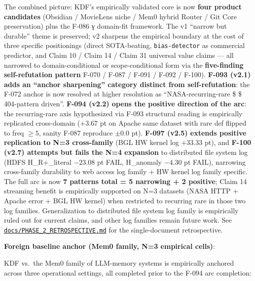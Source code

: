 The combined picture: KDF's empirically validated core is now \textbf{four
product candidates} (Obsidian / MovieLens niche / Mem0 hybrid Router /
Git Core preservation) plus the F-086 γ domain-fit framework. The v1
``narrow but durable'' theme is preserved; v2 sharpens the empirical
boundary at the cost of three specific positionings (direct
SOTA-beating, \texttt{bias-detector} as commercial predictor, and Claim 10 /
Claim 14 / Claim 31 universal value claims --- all narrowed to
domain-conditional or scope-conditional form via the \textbf{five-finding
self-refutation pattern} F-070 / F-087 / F-091 / F-092 / F-100). \textbf{F-093
(v2.1) adds an ``anchor sharpening'' category distinct from
self-refutation}: the F-072 anchor is now resolved at higher
resolution as ``NASA-recurring-rare \$\times {} \times \$
404-pattern driven''. \textbf{F-094 (v2.2) opens the positive direction of
the arc}: the recurring-rare axis hypothesized via F-093 structural
reading is empirically replicated cross-domain (\(+3.67\) pt on Apache
same dataset with rare def flipped to freq \(\ge 5\), sanity F-087
reproduce \(\pm 0.0\) pt). \textbf{F-097 (v2.5) extends positive replication to
N=3 cross-family} (BGL HW kernel log \(+33.33\) pt), and \textbf{F-100 (v2.7)
attempts but fails the N=4 expansion} to distributed file system log
(HDFS H\_R+\_literal \(-23.08\) pt FAIL, H\_anomaly \(-4.30\) pt FAIL),
narrowing cross-family durability to web access log family + HW kernel
log family specific. The full arc is now \textbf{7 patterns total = 5
narrowing + 2 positive}; Claim 14 streaming benefit is empirically
supported on N=3 datasets (NASA HTTP + Apache error + BGL HW kernel)
when restricted to recurring rare in those two log families.
Generalization to distributed file system log family is empirically
ruled out for current claims, and other log families remain future
work. See \href{../PHASE_2_RETROSPECTIVE.md}{\texttt{docs/PHASE\_2\_RETROSPECTIVE.md}}
for the single-document retrospective.

\textbf{Foreign baseline anchor (Mem0 family, N=3 empirical cells)}:

KDF vs.~the Mem0 family of LLM-memory systems is empirically anchored
across three operational settings, all completed prior to the F-094
arc completion:

